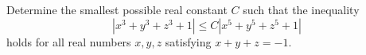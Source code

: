Determine the smallest possible real constant $C$ such that the inequality$$|x^3 + y^3 + z^3 + 1| \leq C|x^5 + y^5 + z^5 + 1|$$holds for all real numbers $x, y, z$ satisfying $x + y + z = -1$.